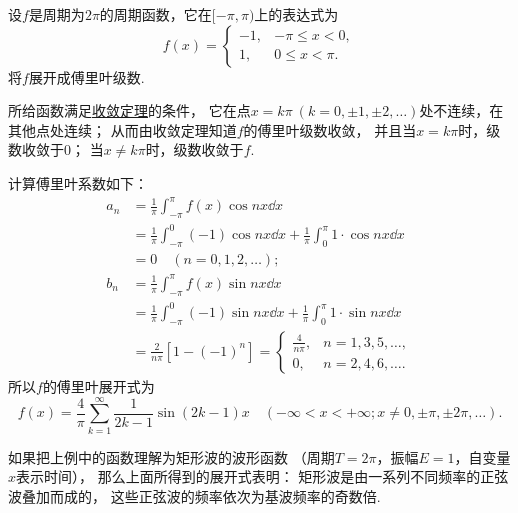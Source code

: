 \begin{example}[矩形波的谐波分析]
设\(f\)是周期为\(2\pi\)的周期函数，它在\([-\pi,\pi)\)上的表达式为\begin{equation*}
	f(x) = \left\{ \begin{array}{cc}
		-1, & -\pi \leq x < 0, \\
		1, & 0 \leq x < \pi.
	\end{array} \right.
\end{equation*}将\(f\)展开成傅里叶级数.
\begin{solution}
所给函数满足\hyperref[theorem:无穷级数.傅里叶级数收敛的狄利克雷充分条件]{收敛定理}的条件，
它在点\(x = k\pi\ (k=0,\pm1,\pm2,\dotsc)\)处不连续，在其他点处连续；
从而由收敛定理知道\(f\)的傅里叶级数收敛，
并且当\(x = k\pi\)时，级数收敛于\(0\)；
当\(x \neq k\pi\)时，级数收敛于\(f\).

计算傅里叶系数如下：
\begin{align*}
	a_n &= \frac{1}{\pi} \int_{-\pi}^\pi f(x) \cos nx \dd{x} \\
		&= \frac{1}{\pi} \int_{-\pi}^0 (-1) \cos nx \dd{x}
			+ \frac{1}{\pi} \int_0^\pi 1 \cdot \cos nx \dd{x} \\
		&= 0 \quad(n=0,1,2,\dotsc); \\
	b_n &= \frac{1}{\pi} \int_{-\pi}^\pi f(x) \sin nx \dd{x} \\
		&= \frac{1}{\pi} \int_{-\pi}^0 (-1) \sin nx \dd{x}
			+ \frac{1}{\pi} \int_0^\pi 1 \cdot \sin nx \dd{x} \\
		&= \frac{2}{n\pi} [1-(-1)^n]
		= \left\{ \begin{array}{cl}
			\frac{4}{n\pi}, & n=1,3,5,\dotsc, \\
			0, & n=2,4,6,\dotsc.
		\end{array} \right.
\end{align*}
所以\(f\)的傅里叶展开式为\begin{equation*}
	f(x) = \frac{4}{\pi} \sum_{k=1}^\infty \frac{1}{2k-1} \sin(2k-1) x
	\quad(-\infty<x<+\infty;x\neq0,\pm\pi,\pm2\pi,\dotsc).
\end{equation*}
\end{solution}
\end{example}
如果把上例中的函数理解为矩形波的波形函数%
（周期\(T=2\pi\)，振幅\(E=1\)，自变量\(x\)表示时间），
那么上面所得到的展开式表明：
矩形波是由一系列不同频率的正弦波叠加而成的，
这些正弦波的频率依次为基波频率的奇数倍.

